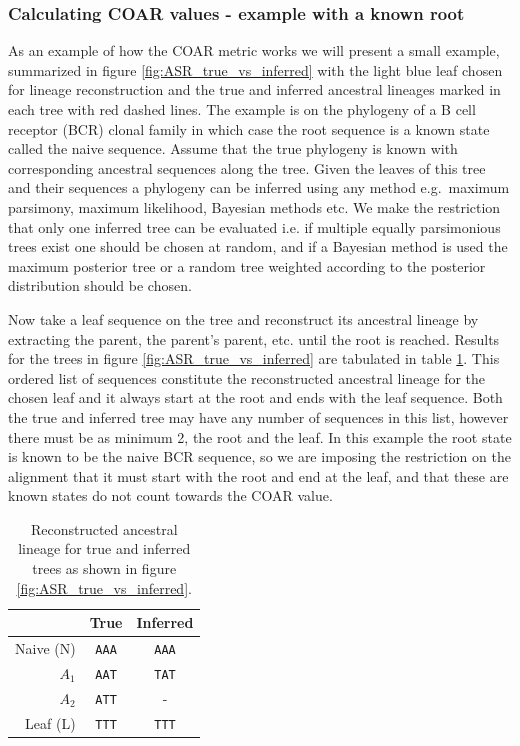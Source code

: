 \subsubsection{Calculating COAR values - example with a known root}
As an example of how the COAR metric works we will present a small example, summarized in figure \ref{fig:ASR_true_vs_inferred} with the light blue leaf chosen for lineage reconstruction and the true and inferred ancestral lineages marked in each tree with red dashed lines.
The example is on the phylogeny of a B cell receptor (BCR) clonal family in which case the root sequence is a known state called the naive sequence.
Assume that the true phylogeny is known with corresponding ancestral sequences along the tree.
Given the leaves of this tree and their sequences a phylogeny can be inferred using any method e.g.\ maximum parsimony, maximum likelihood, Bayesian methods etc.
We make the restriction that only one inferred tree can be evaluated i.e. if multiple equally parsimonious trees exist one should be chosen at random, and if a Bayesian method is used the maximum posterior tree or a random tree weighted according to the posterior distribution should be chosen.

Now take a leaf sequence on the tree and reconstruct its ancestral lineage by extracting the parent, the parent's parent, etc. until the root is reached.
Results for the trees in figure \ref{fig:ASR_true_vs_inferred} are tabulated in table \ref{true_vs_inferred_table}.
This ordered list of sequences constitute the reconstructed ancestral lineage for the chosen leaf and it always start at the root and ends with the leaf sequence.
Both the true and inferred tree may have any number of sequences in this list, however there must be as minimum 2, the root and the leaf.
In this example the root state is known to be the naive BCR sequence, so we are imposing the restriction on the alignment that it must start with the root and end at the leaf, and that these are known states do not count towards the COAR value.

\begin{table}[ht!]
\centering
\begin{tabular}{rcc}
\multicolumn{1}{c}{} & True   & Inferred \\ \hline
Naive (N)            & \texttt{AAA} & \texttt{AAA}         \\ \hline
$A_1$                & \texttt{AAT} & \texttt{TAT}         \\ \hline
$A_2$                & \texttt{ATT} & -                    \\ \hline
Leaf (L)             & \texttt{TTT} & \texttt{TTT}         \\ \hline
\end{tabular}
    \caption{
         \label{true_vs_inferred_table}
             Reconstructed ancestral lineage for true and inferred trees as shown in figure \ref{fig:ASR_true_vs_inferred}.
             }
\end{table}

